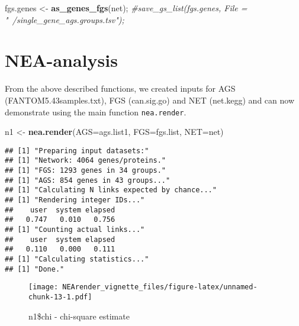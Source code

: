 \documentclass[]{article}
\newenvironment{Shaded}{\begin{snugshade}}{\end{snugshade}}
\newcommand{\KeywordTok}[1]{\textcolor[rgb]{0.13,0.29,0.53}{\textbf{#1}}}
\newcommand{\DataTypeTok}[1]{\textcolor[rgb]{0.13,0.29,0.53}{#1}}
\newcommand{\DecValTok}[1]{\textcolor[rgb]{0.00,0.00,0.81}{#1}}
\newcommand{\StringTok}[1]{\textcolor[rgb]{0.31,0.60,0.02}{#1}}
\newcommand{\CommentTok}[1]{\textcolor[rgb]{0.56,0.35,0.01}{\textit{#1}}}
\newcommand{\OperatorTok}[1]{\textcolor[rgb]{0.81,0.36,0.00}{\textbf{#1}}}
\newcommand{\NormalTok}[1]{#1}
\begin{document}
\begin{Shaded}
\begin{Highlighting}[]
\NormalTok{fgs.genes <-}\StringTok{ }\KeywordTok{as_genes_fgs}\NormalTok{(net);}
\CommentTok{#save_gs_list(fgs.genes, File = "~/single_gene_ags.groups.tsv");}
\end{Highlighting}
\end{Shaded}

\hypertarget{nea-run}{\section{NEA-analysis}\label{nea-run}}

From the above described functions, we created inputs for AGS
(FANTOM5.43samples.txt), FGS (can.sig.go) and NET (net.kegg) and can now
demonstrate using the main function \texttt{nea.render}.

\begin{Shaded}
\begin{Highlighting}[]
\NormalTok{n1 <-}\StringTok{ }\KeywordTok{nea.render}\NormalTok{(}\DataTypeTok{AGS=}\NormalTok{ags.list1, }\DataTypeTok{FGS=}\NormalTok{fgs.list, }\DataTypeTok{NET=}\NormalTok{net)}
\end{Highlighting}
\end{Shaded}

\begin{verbatim}
## [1] "Preparing input datasets:"
## [1] "Network: 4064 genes/proteins."
## [1] "FGS: 1293 genes in 34 groups."
## [1] "AGS: 854 genes in 43 groups..."
## [1] "Calculating N links expected by chance..."
## [1] "Rendering integer IDs..."
##    user  system elapsed 
##   0.747   0.010   0.756 
## [1] "Counting actual links..."
##    user  system elapsed 
##   0.110   0.000   0.111 
## [1] "Calculating statistics..."
## [1] "Done."
\end{verbatim}

\begin{Shaded}
\end{Shaded}

\begin{figure}
\centering
\texttt{[image: NEArender\_vignette\_files/figure-latex/unnamed-chunk-13-1.pdf]}
\caption{n1\$chi - chi-square estimate}
\end{figure}
\end{document}
